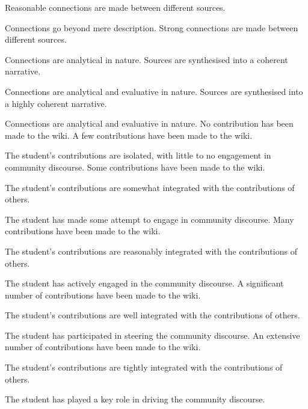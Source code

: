 \documentclass{../../fal_assignment}
\begin{document}
\begin{markingrubric}
        \grade		Reasonable connections are made between different sources.
        \par		Connections go beyond mere description.
        \grade		Strong connections are made between different sources.
        \par		Connections are analytical in nature.
        \grade		Sources are synthesised into a coherent narrative.
        \par		Connections are analytical and evaluative in nature.
        \grade		Sources are synthesised into a highly coherent narrative.
        \par		Connections are analytical and evaluative in nature.
%
        \grade\fail 	No contribution has been made to the wiki.
        \grade 		A few contributions have been made to the wiki.
		\par		The student's contributions are isolated, with little to no engagement in community discourse.
        \grade 		Some contributions have been made to the wiki.
        \par		The student's contributions are somewhat integrated with the contributions of others.
        \par		The student has made some attempt to engage in community discourse.
        \grade 		Many contributions have been made to the wiki.
        \par		The student's contributions are reasonably integrated with the contributions of others.
        \par		The student has actively engaged in the community discourse.
        \grade 		A significant number of contributions have been made to the wiki.
        \par		The student's contributions are well integrated with the contributions of others.
        \par		The student has participated in steering the community discourse.
        \grade 		An extensive number of contributions have been made to the wiki.
        \par		The student's contributions are tightly integrated with the contributions of others.
        \par		The student has played a key role in driving the community discourse.
\end{markingrubric}
\end{document}

